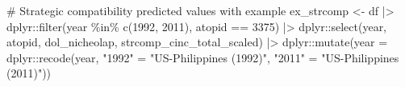 \documentclass[
  12,
  letterpaper,
  DIV=11,
  numbers=noendperiod]{scrartcl}
\newenvironment{Shaded}{\begin{snugshade}}{\end{snugshade}}
\newcommand{\AttributeTok}[1]{\textcolor[rgb]{0.40,0.45,0.13}{#1}}
\newcommand{\CommentTok}[1]{\textcolor[rgb]{0.37,0.37,0.37}{#1}}
\newcommand{\DecValTok}[1]{\textcolor[rgb]{0.68,0.00,0.00}{#1}}
\newcommand{\FunctionTok}[1]{\textcolor[rgb]{0.28,0.35,0.67}{#1}}
\newcommand{\NormalTok}[1]{\textcolor[rgb]{0.00,0.23,0.31}{#1}}
\newcommand{\OtherTok}[1]{\textcolor[rgb]{0.00,0.23,0.31}{#1}}
\newcommand{\SpecialCharTok}[1]{\textcolor[rgb]{0.37,0.37,0.37}{#1}}
\newcommand{\StringTok}[1]{\textcolor[rgb]{0.13,0.47,0.30}{#1}}
\begin{document}
\begin{Shaded}
\begin{Highlighting}[numbers=left,,]
\CommentTok{\# Strategic compatibility predicted values with example}
\NormalTok{ex\_strcomp }\OtherTok{\textless{}{-}}\NormalTok{ df }\SpecialCharTok{|\textgreater{}}
\NormalTok{  dplyr}\SpecialCharTok{::}\FunctionTok{filter}\NormalTok{(year }\SpecialCharTok{\%in\%} \FunctionTok{c}\NormalTok{(}\DecValTok{1992}\NormalTok{, }\DecValTok{2011}\NormalTok{), atopid }\SpecialCharTok{==} \DecValTok{3375}\NormalTok{) }\SpecialCharTok{|\textgreater{}}
\NormalTok{  dplyr}\SpecialCharTok{::}\FunctionTok{select}\NormalTok{(year, atopid, dol\_nicheolap, strcomp\_cinc\_total\_scaled) }\SpecialCharTok{|\textgreater{}}
\NormalTok{  dplyr}\SpecialCharTok{::}\FunctionTok{mutate}\NormalTok{(}\AttributeTok{year =}\NormalTok{ dplyr}\SpecialCharTok{::}\FunctionTok{recode}\NormalTok{(year, }\StringTok{"1992"} \OtherTok{=} \StringTok{"US{-}Philippines (1992)"}\NormalTok{, }\StringTok{"2011"} \OtherTok{=} \StringTok{"US{-}Philippines (2011)"}\NormalTok{))}


\end{Highlighting}
\end{Shaded}
\end{document}
